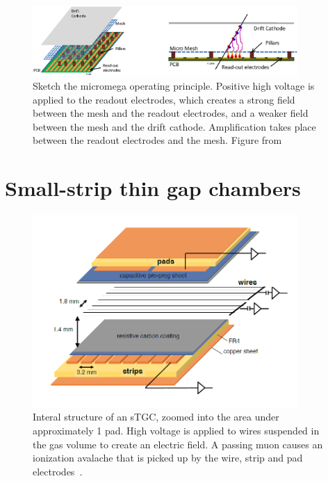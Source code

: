 \begin{figure}
    \centering
    \includegraphics[width = 0.9\textwidth]{figures/micromegas.png}
    \caption{Sketch the micromega operating principle. Positive high voltage is applied to the readout electrodes, which creates a strong field between the mesh and the readout electrodes, and a weaker field between the mesh and the drift cathode. Amplification takes place between the readout electrodes and the mesh. Figure from~\cite{nsw_tdr}}
    \label{fig:micromega}
\end{figure}

\section{Small-strip thin gap chambers}

\begin{figure}
    \centering
    \includegraphics[width = 0.9\textwidth]{figures/stgc_internals.png}
    \caption{Interal structure of an sTGC, zoomed into the area under approximately 1 pad. High voltage is applied to wires suspended in the gas volume to create an electric field. A passing muon causes an ionization avalache that is picked up by the wire, strip and pad electrodes~\cite{lefebvre_precision_2020}.}
    \label{fig:stgc_internals}
\end{figure}

